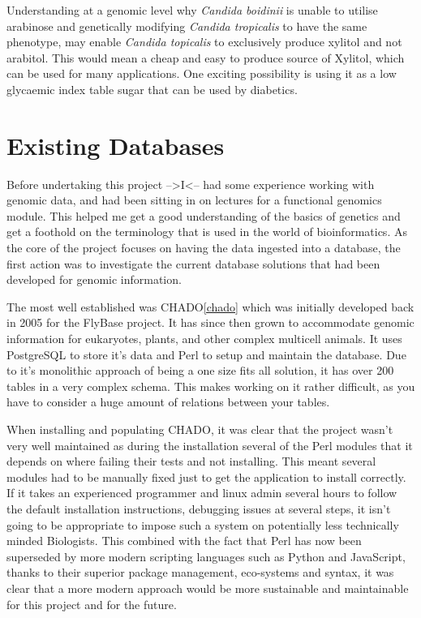 Understanding at a genomic level why \textit{Candida boidinii} is unable to utilise arabinose and genetically modifying \textit{Candida tropicalis} to have the same phenotype, may enable \textit{Candida topicalis} to exclusively produce xylitol and not arabitol. This would mean a cheap and easy to produce source of Xylitol, which can be used for many applications. One exciting possibility is using it as a low glycaemic index table sugar that can be used by diabetics.

\section{Existing Databases}

Before undertaking this project -->I<-- had some experience working with genomic data, and had been sitting in on lectures for a functional genomics module. This helped me get a good understanding of the basics of genetics and get a foothold on the terminology that is used in the world of bioinformatics.  As the core of the project focuses on having the data ingested into a database, the first action was to investigate the current database solutions that had been developed for genomic information. 

The most well established was CHADO\ref{chado} which was initially developed back in 2005\cite{http://flybaselb1.uits.indiana.edu/reports/FBrf0206380.html} for the FlyBase\cite{flybase} project. It has since then grown to accommodate genomic information for eukaryotes, plants, and other complex multicell animals. It uses PostgreSQL\cite{postgres} to store it's data and Perl\cite{perl} to setup and maintain the database. Due to it's monolithic approach of being a one size fits all solution, it has over 200 tables in a very complex schema. This makes working on it rather difficult, as you have to consider a huge amount of relations between your tables. 

When installing and populating CHADO, it was clear that the project wasn't very well maintained as during the installation several of the Perl modules that it depends on where failing their tests and not installing. This meant several modules had to be manually fixed just to get the application to install correctly. If it takes an experienced programmer and linux admin several hours to follow the default installation instructions, debugging issues at several steps, it isn't going to be appropriate to impose such a system on potentially less technically minded Biologists. This combined with the fact that Perl has now been superseded by more modern scripting languages such as Python\cite{python} and JavaScript\cite{javascript}, thanks to their superior package management, eco-systems and syntax, it was clear that a more modern approach would be more sustainable and maintainable for this project and for the future. 

